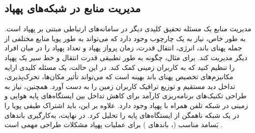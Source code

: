 \subsection{مدیریت منابع در شبکه‌های پهپاد}
مدیریت منابع یک مسئله تحقیق کلیدی دیگر در سامانه‌های ارتباطی مبتنی بر پهپاد است. به طور خاص، نیاز به یک چارچوب وجود دارد که می‌تواند به طور پویا منابع مختلفی از جمله پهنای باند، انرژی، انتقال قدرت، زمان پرواز پهپاد و تعداد پهپاد را در میان افراد دیگر مدیریت کند. برای مثال، چگونه به طور تطبیقی قدرت انتقال و خط سیر یک پهپاد را تنظیم کنید که به کاربران زمینی کمک کند. در این حالت، یک مسئله کلیدی ارایه مکانیزم‌های تخصیص پهنای باند بهینه است که می‌تواند تأثیر مکان‌ها، تحرک‌پذیری، تداخل دید مستقیم و توزیع ترافیک کاربران زمین را به دست آورد. همچنین، نیاز به طراحی تکنیک‌های برنامه‌ریزی کارآمد برای کاهش تداخل بین ایستگاه‌های پایه هوایی و زمینی در شبکه تلفن همراه با پهپاد وجود دارد. علاوه بر این، باید اشتراک طیفی پویا را در یک شبکه ناهمگن از ایستگاه‌های پایه را تحلیل کرد. در نهایت، به‌کارگیری باندهای بَسامد مناسب (، باندهای ) برای عملیات پهپاد مشکلات طراحی مهمی است \cite{ismail2024line,8807386}.